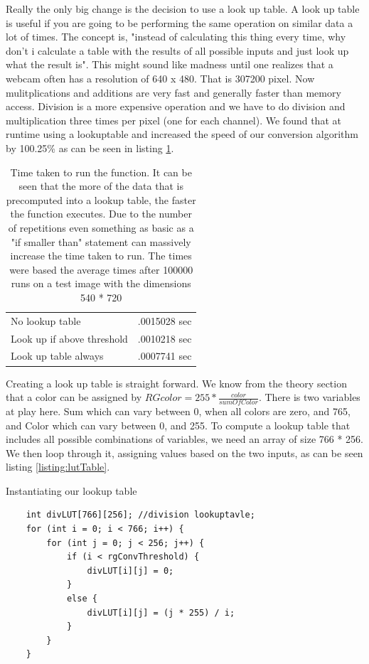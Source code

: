 Really the only big change is the decision to use a look up table. A look up table is useful if you are going to be performing the same operation on similar data a lot of times. The concept is, "instead of calculating this thing every time, why don't i calculate a table with the results of all possible inputs and just look up what the result is". This might sound like madness until one realizes that a webcam often has a resolution of 640 x 480. That is 307200 pixel. Now mulitplications and additions are very fast and generally faster than memory access. Division is a more expensive operation and we have to do division and multiplication three times per pixel (one for each channel). We found that at runtime using a lookuptable and increased the speed of our conversion algorithm by 100.25\% as can be seen in listing \ref{rgConvSpeed}. 
\begin{center}
	\begin{table}[H]
		\centering
		\label{rgConvSpeed}
		\begin{tabular}{ l | l }
			\hline			
			No lookup table & .0015028 sec\\
			Look up if above threshold & .0010218 sec\\
			Look up table always& .0007741 sec\\
			\hline 
		\end{tabular}
	\caption{Time taken to run the function. It can be seen that the more of the data that is precomputed into a lookup table, the faster the function executes. Due to the number of repetitions even something as basic as a "if smaller than" statement can massively increase the time taken to run. The times were based the average times after 100000 runs on a test image with the dimensions 540 * 720}
	\end{table}
\end{center}
Creating a look up table is straight forward. We know from the theory section that a color can be assigned by $RGcolor = 255 * \frac{color}{sumOfColor}$. There is two variables at play here. Sum which can vary between 0, when all colors are zero, and 765, and Color which can vary between 0, and 255. To compute a lookup table  that includes all possible combinations of variables, we need an array of size 766 * 256. We then loop through it, assigning values based on the two inputs, as can be seen listing \ref{listing:lutTable}.\\
\begin{listing}[H]
\caption{Instantiating our lookup table}
\label{listing:lutTable}
\begin{verbatim}
	int divLUT[766][256]; //division lookuptavle;
	for (int i = 0; i < 766; i++) {
		for (int j = 0; j < 256; j++) {
			if (i < rgConvThreshold) { 
				divLUT[i][j] = 0;
			}
			else {
				divLUT[i][j] = (j * 255) / i;
			}
		}
	}
\end{verbatim}
\end{listing}
